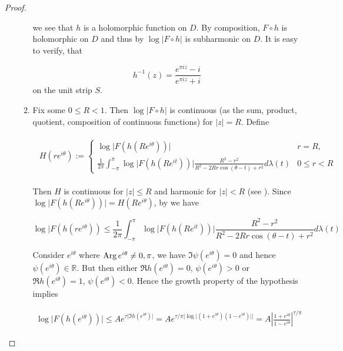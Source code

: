 \begin{proof}
\begin{enumerate}[label = \textbf{(\roman*)}]
\begin{enumerate}[label = \textbf{\alph*.}]
we see that $h$ is a holomorphic function on $D$. By composition, $F \circ h$ is holomorphic on $D$ and thus by \cite[336]{rudin:rc_analysis:1987} $\log\vert F \circ h \vert$ is subharmonic on $D$. It is easy to verify, that 

\begin{equation}
	h^{-1}(z) = \frac{e^{\pi i z} - i}{e^{\pi i z} + i}
	\label{eq:h_inv}
\end{equation}
 on the unit strip $S$.\\

 \item Fix some $0 \leqslant R < 1$. Then $\log\vert F \circ h \vert$ is continuous (as the sum, product, quotient, composition of continuous functions) for $\vert z \vert = R$. Define 

\begin{gather*}
	\begin{aligned}
		H(re^{i\theta}):= \begin{cases}
			\displaystyle
			\log \vert F(h(Re^{i\theta}))\vert & r = R,\\
			\displaystyle
			\frac{1}{2\pi} \int_{-\pi}^\pi \log\vert F(h(Re^{it}))\vert \frac{R^2 - r^2}{R^2 - 2Rr\cos(\theta - t) + r^2} d\lambda(t) & 0 \leqslant r < R
	\end{cases}
	\end{aligned}
\end{gather*}

Then $H$ is continuous for $\vert z \vert \leqslant R$ and harmonic for $\vert z \vert < R$ (see \cite[234--235]{rudin:rc_analysis:1987}). Since $\log\vert F(h(Re^{i\theta}))\vert = H(Re^{i\theta})$, by \cite[336]{rudin:rc_analysis:1987} we have

\begin{equation}
	\log\vert F(h(re^{i\theta})) \leqslant \frac{1}{2\pi} \int_{-\pi}^\pi \log\vert F(h(Re^{it}))\vert \frac{R^2 - r^2}{R^2 - 2Rr\cos(\theta - t) + r^2} d\lambda(t) 
\end{equation}

Consider $e^{i\theta}$ where $\operatorname{Arg} e^{i\theta} \neq 0,\pi$, we have $\Im \psi(e^{i\theta}) = 0$ and hence $\psi(e^{i\theta}) \in \mathbb{R}$. But then either $\Re h(e^{i\theta}) = 0$, $\psi(e^{i\theta}) > 0$ or $\Re h(e^{i\theta}) = 1$, $\psi(e^{i\theta}) < 0$. Hence the growth property of the hypothesis implies

\begin{gather*}
		\log \vert F(h(e^{i\theta})) \vert \leqslant Ae^{\tau\vert \Im h(e^{i\theta})\vert}
		= Ae^{\tau/\pi\vert \log\vert (1 + e^{i\theta})(1 - e^{i\theta})\vert\vert}
		= A \left\vert \frac{1 + e^{i\theta}}{1 - e^{i\theta}} \right\vert^{\tau/\pi}
\end{gather*}


\end{enumerate}
\end{enumerate}
\end{proof}
